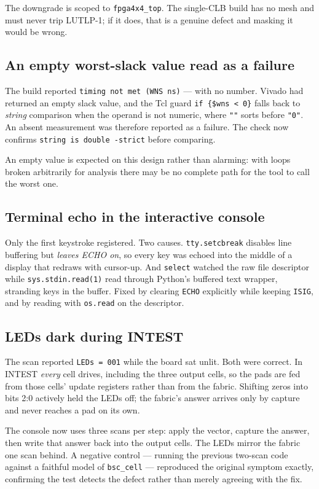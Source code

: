 \documentclass[11pt,a4paper]{article}
\newcommand{\file}[1]{\texttt{#1}}
\begin{document}
The downgrade is scoped to \file{fpga4x4\_top}. The single-CLB build has no mesh
and must never trip LUTLP-1; if it does, that is a genuine defect and masking it
would be wrong.

\subsection{An empty worst-slack value read as a failure}

The build reported \texttt{timing not met (WNS  ns)} --- with no number. Vivado
had returned an empty slack value, and the Tcl guard \texttt{if \{\$wns < 0\}}
falls back to \emph{string} comparison when the operand is not numeric, where
\texttt{""} sorts before \texttt{"0"}. An absent measurement was therefore
reported as a failure. The check now confirms \texttt{string is double -strict}
before comparing.

An empty value is expected on this design rather than alarming: with loops
broken arbitrarily for analysis there may be no complete path for the tool to
call the worst one.

\subsection{Terminal echo in the interactive console}

Only the first keystroke registered. Two causes. \texttt{tty.setcbreak} disables
line buffering but \emph{leaves ECHO on}, so every key was echoed into the middle
of a display that redraws with cursor-up. And \texttt{select} watched the raw
file descriptor while \texttt{sys.stdin.read(1)} read through Python's buffered
text wrapper, stranding keys in the buffer. Fixed by clearing \texttt{ECHO}
explicitly while keeping \texttt{ISIG}, and by reading with \texttt{os.read} on
the descriptor.

\subsection{LEDs dark during INTEST}

The scan reported \texttt{LEDs = 001} while the board sat unlit. Both were
correct. In INTEST \emph{every} cell drives, including the three output cells, so
the pads are fed from those cells' update registers rather than from the fabric.
Shifting zeros into bits 2:0 actively held the LEDs off; the fabric's answer
arrives only by capture and never reaches a pad on its own.

The console now uses three scans per step: apply the vector, capture the answer,
then write that answer back into the output cells. The LEDs mirror the fabric one
scan behind. A negative control --- running the previous two-scan code against a
faithful model of \file{bsc\_cell} --- reproduced the original symptom exactly,
confirming the test detects the defect rather than merely agreeing with the fix.
\end{document}
